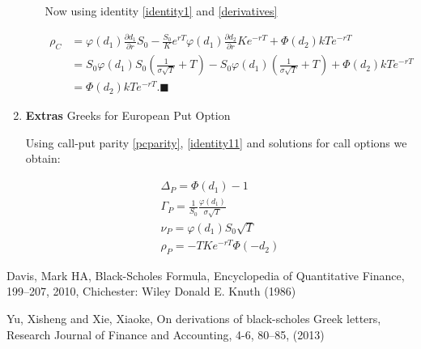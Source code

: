 \documentclass[12pt]{article}
\begin{document}
\begin{enumerate}[leftmargin=\labelsep]
\begin{itemize}
Now using identity \eqref{identity1} and \eqref{derivatives} 

\begin{equation}
\begin{split}\label{rho_c2}
    \rho_C &= \varphi(d_1)  \frac{\partial d_1}{\partial r} S_0 - 
        \frac{S_0}{K} e^{rT} \varphi(d_1)  \frac{\partial d_2}{\partial r} Ke^{-rT}
        + \Phi(d_2) kT e^{-rT}\\
        &=  S_0 \varphi(d_1)  S_0  \left(\frac{1}{\sigma \sqrt{T}} + T \right)- 
        S_0 \varphi(d_1)   \left(\frac{1}{\sigma \sqrt{T}} + T \right) 
        + \Phi(d_2) kT e^{-rT}\\
        &= \Phi(d_2) kT e^{-rT}. \blacksquare
\end{split}
\end{equation}

\end{itemize}


\item \textbf{Extras} Greeks for European Put Option

Using call-put parity \eqref{pcparity}, \eqref{identity11} and solutions for call options we obtain:

\begin{align}
    \Delta_P = \Phi(d_1) - 1\\
    \Gamma_P = \frac{1}{S_0}\frac{\varphi(d_1)}{\sigma  \sqrt{T}}\\
    \nu_P = \varphi(d_1) S_0 \sqrt{T} \\
    \rho_P = -T K e^{-rT} \Phi(-d_2)
\end{align}

\end{enumerate}

\begin{thebibliography}{9}

Davis, Mark HA, Black-Scholes Formula, Encyclopedia of Quantitative Finance, 199--207, 2010, Chichester: Wiley
Donald E. Knuth (1986)

Yu, Xisheng and Xie, Xiaoke, On derivations of black-scholes Greek letters, Research Journal of Finance and Accounting, 4-6, 80--85, (2013)


\end{thebibliography}
\end{document}

